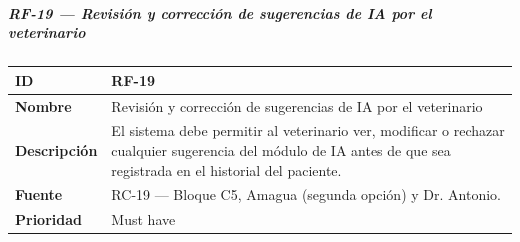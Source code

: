 \documentclass[
]{article}
\newcounter{none} %
\begin{document}
\subparagraph{RF-19 --- Revisión y corrección de sugerencias de IA por
el
veterinario}\label{rf-19-revisiuxf3n-y-correcciuxf3n-de-sugerencias-de-ia-por-el-veterinario}

{\def\LTcaptype{none} %
\begin{longtable}[]{@{}
  >{\raggedright\arraybackslash}p{}
  >{\raggedright\arraybackslash}p{}@{}}
\toprule\noalign{}
\begin{minipage}[b]{\linewidth}\raggedright
\textbf{ID}
\end{minipage} & \begin{minipage}[b]{\linewidth}\raggedright
RF-19
\end{minipage} \\
\midrule\noalign{}
\endhead
\bottomrule\noalign{}
\endlastfoot
\textbf{Nombre} & \begin{minipage}[t]{\linewidth}\raggedright
Revisión y corrección de sugerencias de IA por el veterinario
\end{minipage} \\
\textbf{Descripción} & \begin{minipage}[t]{\linewidth}\raggedright
El sistema debe permitir al veterinario ver, modificar o rechazar
cualquier sugerencia del módulo de IA antes de que sea registrada en el
historial del paciente.
\end{minipage} \\
\textbf{Fuente} & \begin{minipage}[t]{\linewidth}\raggedright
RC-19 --- Bloque C5, Amagua (segunda opción) y Dr. Antonio.
\end{minipage} \\
\textbf{Prioridad} & \begin{minipage}[t]{\linewidth}\raggedright
Must have
\end{minipage} \\
\end{longtable}
}
\end{document}
